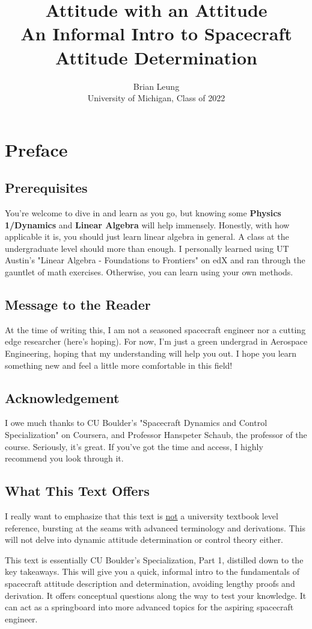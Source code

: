 \documentclass[a4paper,14pt]{extreport}
\title{Attitude with an Attitude \\
\large An Informal Intro to Spacecraft Attitude Determination}
\author{Brian Leung\\University of Michigan, Class of 2022}
\begin{document}
\maketitle
\setcounter{tocdepth}{0}
\tableofcontents{}
\chapter{Preface}
\section{Prerequisites}
You're welcome to dive in and learn as you go, but knowing some \textbf{Physics 1/Dynamics} and \textbf{Linear Algebra} will help immensely. Honestly, with how applicable it is, you should just learn linear algebra in general. A class at the undergraduate level should more than enough. I personally learned using UT Austin's "Linear Algebra - Foundations to Frontiers" on edX and ran through the gauntlet of math exercises. Otherwise, you can learn using your own methods.

\section{Message to the Reader}
At the time of writing this, I am not a seasoned spacecraft engineer nor a cutting edge researcher (here's hoping). For now, I'm just a green undergrad in Aerospace Engineering, hoping that my understanding  will help you out. I hope you learn something new and feel a little more comfortable in this field!

\section{Acknowledgement}
I owe much thanks to CU Boulder's "Spacecraft Dynamics and Control Specialization" on Coursera, and Professor Hanspeter Schaub, the professor of the course. Seriously, it's great. If you've got the time and access, I highly recommend you look through it.

\section{What This Text Offers}
I really want to emphasize that this text is \underline{not} a university textbook level reference, bursting at the seams with advanced terminology and derivations. This will not delve into dynamic attitude determination or control theory either. 

This text is essentially CU Boulder's Specialization, Part 1, distilled down to the key takeaways. This will give you a quick, informal intro to the fundamentals of spacecraft attitude description and determination, avoiding lengthy proofs and derivation. It offers conceptual questions along the way to test your knowledge. It can act as a springboard into more advanced topics for the aspiring spacecraft engineer.
\end{document}
